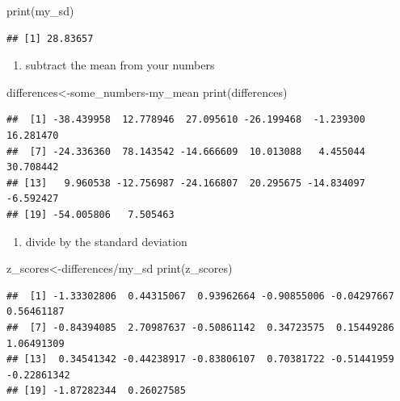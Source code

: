 \documentclass[
]{book}
\newenvironment{Shaded}{\begin{snugshade}}{\end{snugshade}}
\newcommand{\FunctionTok}[1]{\textcolor[rgb]{0.00,0.00,0.00}{#1}}
\newcommand{\NormalTok}[1]{#1}
\newcommand{\OtherTok}[1]{\textcolor[rgb]{0.56,0.35,0.01}{#1}}
\newcommand{\SpecialCharTok}[1]{\textcolor[rgb]{0.00,0.00,0.00}{#1}}
\providecommand{\tightlist}{%
  \setlength{\itemsep}{0pt}\setlength{\parskip}{0pt}}
\begin{document}
\begin{Shaded}
\begin{Highlighting}[]
\FunctionTok{print}\NormalTok{(my\_sd)}
\end{Highlighting}
\end{Shaded}

\begin{verbatim}
## [1] 28.83657
\end{verbatim}

\begin{enumerate}
\def\labelenumi{\arabic{enumi}.}
\setcounter{enumi}{2}
\tightlist
\item
  subtract the mean from your numbers
\end{enumerate}

\begin{Shaded}
\begin{Highlighting}[]
\NormalTok{differences}\OtherTok{\textless{}{-}}\NormalTok{some\_numbers}\SpecialCharTok{{-}}\NormalTok{my\_mean}
\FunctionTok{print}\NormalTok{(differences)}
\end{Highlighting}
\end{Shaded}

\begin{verbatim}
##  [1] -38.439958  12.778946  27.095610 -26.199468  -1.239300  16.281470
##  [7] -24.336360  78.143542 -14.666609  10.013088   4.455044  30.708442
## [13]   9.960538 -12.756987 -24.166807  20.295675 -14.834097  -6.592427
## [19] -54.005806   7.505463
\end{verbatim}

\begin{enumerate}
\def\labelenumi{\arabic{enumi}.}
\setcounter{enumi}{3}
\tightlist
\item
  divide by the standard deviation
\end{enumerate}

\begin{Shaded}
\begin{Highlighting}[]
\NormalTok{z\_scores}\OtherTok{\textless{}{-}}\NormalTok{differences}\SpecialCharTok{/}\NormalTok{my\_sd}
\FunctionTok{print}\NormalTok{(z\_scores)}
\end{Highlighting}
\end{Shaded}

\begin{verbatim}
##  [1] -1.33302806  0.44315067  0.93962664 -0.90855006 -0.04297667  0.56461187
##  [7] -0.84394085  2.70987637 -0.50861142  0.34723575  0.15449286  1.06491309
## [13]  0.34541342 -0.44238917 -0.83806107  0.70381722 -0.51441959 -0.22861342
## [19] -1.87282344  0.26027585
\end{verbatim}
\end{document}

